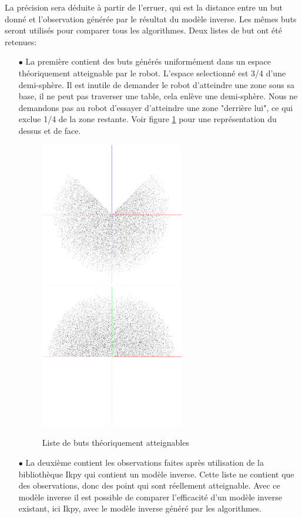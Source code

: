 \documentclass[11pt,french]{report}
\begin{document}
La précision sera déduite à partir de l'erruer, qui est la distance entre un but donné et l'observation générée par le résultat du modèle inverse. Les mêmes buts seront utilisés pour comparer tous les algorithmes. Deux listes de but ont été retenues:

\begin{itemize}
    \item[$\bullet$] La première contient des buts générés uniformément dans un espace théoriquement atteignable par le robot. L'espace selectionné est 3/4 d'une demi-sphère. Il est inutile de demander le robot d'atteindre une zone sous sa base, il ne peut pas traverser une table, cela enlève une demi-sphère. Nous ne demandons pas au robot d'essayer d'atteindre une zone "derrière lui", ce qui exclue 1/4 de la zone restante. Voir figure \ref{fig:goal_list} pour une représentation du dessus et de face.
    
    \begin{figure}
        \centering
        \includegraphics[width=178pt]{goal_list_top} \includegraphics[width=178pt]{goal_list_front}
        \caption{Liste de buts théoriquement atteignables}
        \label{fig:goal_list}
    \end{figure}
    
    \item[$\bullet$] La deuxième contient les observations faites après utilisation de la bibliothèque Ikpy qui contient un modèle inverse. Cette liste ne contient que des observations, donc des point qui sont réellement atteignable. Avec ce modèle inverse il est possible de comparer l'efficacité d'un modèle inverse existant, ici Ikpy, avec le modèle inverse généré par les algorithmes.
\end{itemize}
\end{document}
